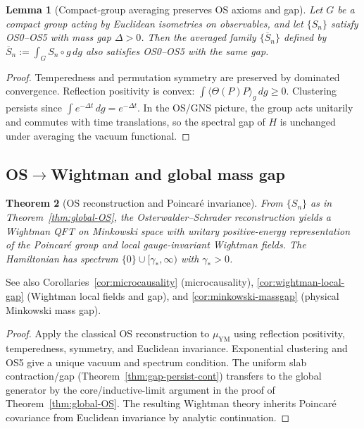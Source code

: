\documentclass[11pt]{amsart}
\theoremstyle{plain}
\newtheorem{theorem}{Theorem}[section]
\newtheorem{lemma}[theorem]{Lemma}
\theoremstyle{definition}
\theoremstyle{remark}
\begin{document}
\begin{lemma}[Compact-group averaging preserves OS axioms and gap]\label{lem:group-avg}
Let $G$ be a compact group acting by Euclidean isometries on observables, and let $\{S_n\}$ satisfy OS0--OS5 with mass gap $\Delta>0$. Then the averaged family $\{\overline{S}_n\}$ defined by $\overline{S}_n:=\int_G S_n\circ g\,dg$ also satisfies OS0--OS5 with the same gap.
\end{lemma}
\begin{proof}
Temperedness and permutation symmetry are preserved by dominated convergence. Reflection positivity is convex: $\int \langle\Theta(P)P\rangle_g\,dg\ge 0$. Clustering persists since $\int e^{-\Delta t}\,dg=e^{-\Delta t}$. In the OS/GNS picture, the group acts unitarily and commutes with time translations, so the spectral gap of $H$ is unchanged under averaging the vacuum functional.
\end{proof}

\subsection{OS$\to$Wightman and global mass gap}

\begin{theorem}[OS reconstruction and Poincar\'e invariance]\label{thm:os-to-wightman-global}
From $\{S_n\}$ as in Theorem~\ref{thm:global-OS}, the Osterwalder--Schrader reconstruction yields a Wightman QFT on Minkowski space with unitary positive-energy representation of the Poincar\'e group and local gauge-invariant Wightman fields. The Hamiltonian has spectrum $\{0\}\cup[\gamma_*,\infty)$ with $\gamma_*>0$.
\end{theorem}
\noindent See also Corollaries~\ref{cor:microcausality} (microcausality), \ref{cor:wightman-local-gap} (Wightman local fields and gap), and \ref{cor:minkowski-massgap} (physical Minkowski mass gap).
\begin{proof}
Apply the classical OS reconstruction to $\mu_{\mathrm{YM}}$ using reflection positivity, temperedness, symmetry, and Euclidean invariance. Exponential clustering and OS5 give a unique vacuum and spectrum condition. The uniform slab contraction/gap (Theorem~\ref{thm:gap-persist-cont}) transfers to the global generator by the core/inductive-limit argument in the proof of Theorem~\ref{thm:global-OS}. The resulting Wightman theory inherits Poincar\'e covariance from Euclidean invariance by analytic continuation.
\end{proof}
\end{document}

